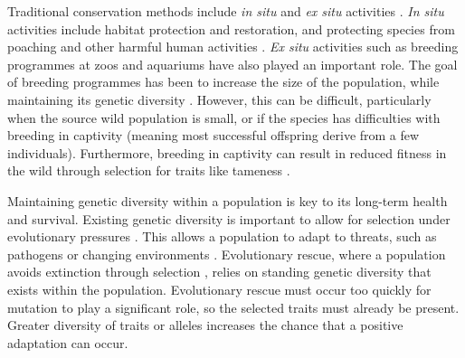 \documentclass[12pt]{article}
\begin{document}
	Traditional conservation methods include \textit{in situ} and 
	\textit{ex situ} activities \citep{angelesChallengesDevelopmentBiodiversity2022}.
	\textit{In situ} activities include habitat
	protection and restoration, and protecting species from poaching and other
	harmful human activities \citep{mccarthyFinancialCostsMeeting2012}.
	\textit{Ex situ} activities such as breeding
	programmes at zoos and aquariums have also played an important role.
	The goal of breeding
	programmes has been to increase the size of the population, while
	maintaining its genetic diversity
	\citep{farquharsonOffspringSurvivalChanges2021}. However, this can be 
	difficult, particularly when the source wild population is small, or if the species has
	difficulties with breeding in captivity (meaning most successful
	offspring derive from a few individuals). Furthermore, breeding in captivity can
	result in reduced fitness in the wild through selection for traits like tameness
	\citep{arakiCarryoverEffectCaptive2009,fordSelectionCaptivitySupportive2002}.
	
	Maintaining genetic diversity within a population is key to its long-term health and
	survival. Existing genetic diversity is important to allow for selection under
	evolutionary pressures \citep{harmonConservationSmallPopulations2010}. This allows a population to adapt to threats, such as pathogens or changing environments
	\citep{mccallumTasmanianDevilFacial2008}. Evolutionary rescue, where a population
	avoids extinction through selection
	\citep{bellEvolutionaryRescue2017}, relies on standing genetic diversity that
	exists within the population. Evolutionary rescue must occur too quickly
	for mutation to play a significant role, so the selected traits must already
	be present.
	Greater diversity of traits or alleles
	increases the chance that a positive adaptation can occur.
	
\end{document}
